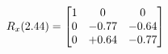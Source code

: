 \documentclass[preview]{standalone}
\begin{document}
\begin{align*}
\special{dvisvgm:raw <g id='unique000'>}R_{x}(2.44) = \begin{bmatrix}1 & 0 & 0 \\0 & -0.77 & -0.64 \\0 & +0.64 & -0.77\end{bmatrix}\special{dvisvgm:raw </g>}
\end{align*}
\end{document}
